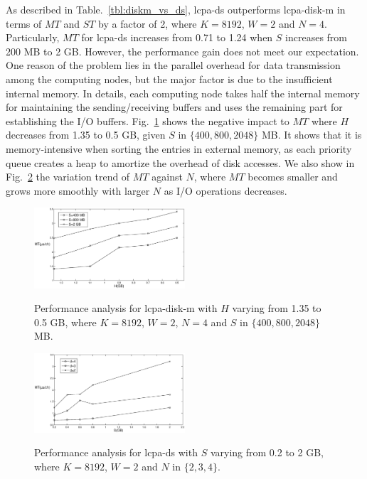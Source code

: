\documentclass[10pt,journal,compsoc]{IEEEtran}
\begin{document}
\begin{CJK*}{GBK}{song}
As described in Table.~\ref{tbl:diskm_vs_ds}, lcpa-ds outperforms lcpa-disk-m in terms of $MT$ and $ST$ by a factor of 2, where $K=8192$, $W=2$ and $N=4$. Particularly, $MT$ for lcpa-ds increases from 0.71 to 1.24 when $S$ increases from 200 MB to 2 GB. However, the performance gain does not meet our expectation. One reason of the problem lies in the parallel overhead for data transmission among the computing nodes, but the major factor is due to the insufficient internal memory. In details, each computing node takes half the internal memory for maintaining the sending/receiving buffers and uses the remaining part for establishing the I/O buffers. Fig.~\ref{fig:stxxl_pq_impact} shows the negative impact to $MT$ where $H$ decreases from 1.35 to 0.5 GB, given $S$ in $\{400, 800, 2048\}$ MB. It shows that it is memory-intensive when sorting the entries in external memory, as each priority queue creates a heap to amortize the overhead of disk accesses. We also show in Fig.~\ref{fig:ds_varying_n} the variation trend of $MT$ against $N$, where $MT$ becomes smaller and grows more smoothly with larger $N$ as I/O operations decreases.



\begin{figure}[hbtp!]
  \centering
  \includegraphics[width=0.5\textwidth]{stxxl_pq_impact.eps}\\
  \caption{Performance analysis for lcpa-disk-m with $H$ varying from 1.35 to 0.5 GB, where $K=8192$, $W=2$, $N=4$ and $S$ in $\{400, 800, 2048\}$ MB.}
  \label{fig:stxxl_pq_impact}
\end{figure}



\begin{figure}[hbtp!]
  \centering
  \includegraphics[width=0.5\textwidth]{ds_varying_n.eps}\\
  \caption{Performance analysis for lcpa-ds with $S$ varying from 0.2 to 2 GB, where $K=8192$, $W=2$ and $N$ in $\{2,3,4\}$.}
  \label{fig:ds_varying_n}
\end{figure}



\end{CJK*}
\end{document}
